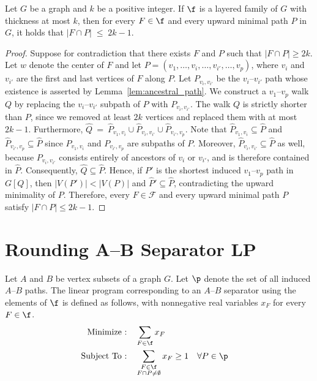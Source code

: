 \begin{lemma}\label{lem:minimal_paths_are_short}
    Let $G$ be a graph and $k$ be a positive integer. If $\f$ is a layered family of $G$ with thickness at most $k$, then for every $F \in \f$ and every upward minimal path $P$ in $G$, it holds that $|F \cap P| \;\leq\; 2k - 1$. 
\end{lemma}
\begin{proof}
    Suppose for contradiction that there exists $F$ and $P$ such that $|F \cap P| \geq 2 k$. Let $w$ denote the center of $F$ and let $P = (v_1, \dots, v_i, \dots, v_{i'}, \dots, v_p)$, where $v_i$ and $v_{i'}$ are the first and last vertices of $F$ along $P$. Let $P_{v_i,v_{i'}}$ be the $v_i$--$v_{i'}$ path whose existence is asserted by Lemma~\ref{lem:ancestral_path}. We construct a $v_1$--$v_p$ walk $Q$ by replacing the $v_i$--$v_{i'}$ subpath of $P$ with $P_{v_i,v_{i'}}$. 
    The walk $Q$ is strictly shorter than $P$, since we removed at least $2k$ vertices and replaced them with at most $2k-1$. Furthermore, $\widehat{Q}\ =\ \widehat{P}_{v_1,v_i} \cup \widehat{P}_{v_i,v_{i'}} \cup \widehat{P}_{v_{i'},v_p}$. Note that $\widehat{P}_{v_1,v_i} \subseteq \widehat{P}$ and $\widehat{P}_{v_{i'},v_p} \subseteq \widehat{P}$ since $P_{v_1,v_i}$ and $P_{v_{i'},v_p}$ are subpaths of $P$. Moreover, $\widehat{P}_{v_i,v_{i'}} \subseteq \widehat{P}$ as well, because $P_{v_i,v_{i'}}$ consists entirely of ancestors of $v_i$ or $v_{i'}$, and is therefore contained in $\widehat{P}$. Consequently, $\widehat{Q} \subseteq \widehat{P}$. Hence, if $P'$ is the shortest induced $v_1$--$v_p$ path in $G[Q]$, then $|V(P')| < |V(P)|$ and $\widehat{P}' \subseteq \widehat{P}$, contradicting the upward minimality of $P$. Therefore, every $F \in \mathcal{F}$ and every upward minimal path $P$ satisfy $|F \cap P| \leq 2k-1$. 
\end{proof}

\section{Rounding A--B Separator LP}\label{sec:rounding_ab_sep}
Let $A$ and $B$ be vertex subsets of a graph $G$. Let $\p$ denote the set of all induced $A$--$B$ paths. The linear program corresponding to an $A$--$B$ separator using the elements of $\f$ is defined as follows, with nonnegative real variables $x_F$ for every $F \in \f$.
%
\begin{align}\label{lp:ab_separator_using_f}
    \text{Minimize :}&\quad \sum\limits_{F\in \f} x_F\\
    \nonumber \text{Subject To :}&\quad \sum_{\substack{F \in \f \\ F \cap P \neq \emptyset}} x_F \geq 1 && \forall P \in \p
\end{align}

